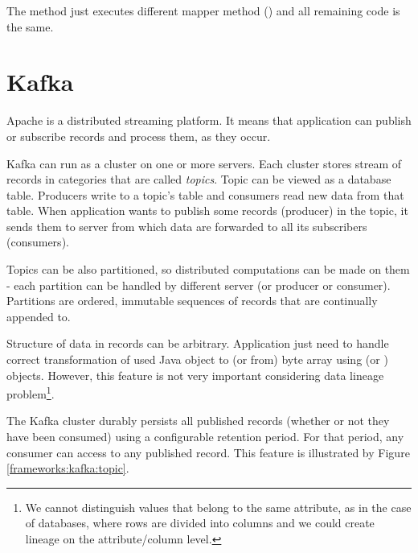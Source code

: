 The  method just executes different mapper method ()
and all remaining code is the same.




\section{Kafka \label{frameworks:kafka}}

Apache \citet{Kafka} is a distributed streaming platform.
It means that application can publish or subscribe records and
process them, as they occur.

Kafka can run as a cluster on one or more servers.
Each cluster stores stream of records in categories that are called \textit{topics}.
Topic can be viewed as a database table. Producers write to a topic's table
and consumers read new data from that table.
When application wants to publish some records (producer) in the topic,
it sends them to server from which data are forwarded to all its subscribers (consumers).

Topics can be also partitioned, so distributed computations can be made
on them - each partition can be handled by different server (or producer or consumer).
Partitions are ordered, immutable sequences of records that are continually appended to.

Structure of data in records can be arbitrary. Application just need to handle
correct transformation of used Java object to (or from) byte array using
 (or ) objects.
However, this feature is not very important considering data lineage problem\footnote{
  We cannot distinguish values that belong to the same attribute, as in the case
  of databases, where rows are divided into columns and we could create
  lineage on the attribute/column level.
}.

The Kafka cluster durably persists all published records (whether or not they have been consumed)
using a configurable retention period. For that period, any consumer can access
to any published record. This feature is illustrated by Figure \ref{frameworks:kafka:topic}.

